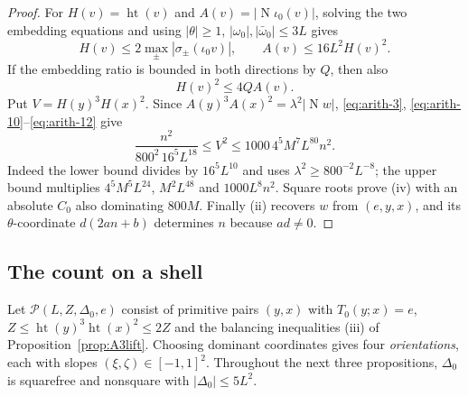 \documentclass[11pt,reqno]{amsart}
\theoremstyle{definition}
\theoremstyle{remark}
\numberwithin{equation}{section}
\newcommand{\Nm}{\operatorname{N}}
\newcommand{\hgt}{\operatorname{ht}}
\begin{document}
\begin{proof}
For $H(v)=\hgt(v)$ and $A(v)=|\Nm\iota_0(v)|$, solving the two
embedding equations and using $|\theta|\ge1$, $|\omega_0|,|\bar\omega_0|\le3L$
gives
\begin{equation}
 H(v)\le2\max_\pm|\sigma_\pm(\iota_0v)|,
 \qquad A(v)\le16L^2H(v)^2.                     \label{eq:arith-11}
\end{equation}
If the embedding ratio is bounded in both directions by $Q$, then also
\begin{equation}
 H(v)^2\le4QA(v).                              \label{eq:arith-12}
\end{equation}
Put $V=H(y)^3H(x)^2$. Since $A(y)^3A(x)^2=\lambda^2|\Nm w|$,
\eqref{eq:arith-3}, \eqref{eq:arith-10}--\eqref{eq:arith-12} give
\begin{equation}
 \frac{n^2}{800^2\,16^5L^{18}}\le V^2
 \le1000\,4^5M^7L^{80}n^2.                      \label{eq:arith-13}
\end{equation}
Indeed the lower bound divides by $16^5L^{10}$ and uses
$\lambda^2\ge800^{-2}L^{-8}$; the upper bound multiplies
$4^5M^5L^{24}$, $M^2L^{48}$ and $1000L^8n^2$.
Square roots prove (iv) with an absolute $C_0$ also dominating $800M$.
Finally (ii) recovers $w$ from $(e,y,x)$, and its $\theta$-coordinate
$d(2an+b)$ determines $n$ because $ad\ne0$.
\end{proof}

\subsection{The count on a shell}
Let $\mathcal P(L,Z,\Delta_0,e)$ consist of primitive pairs $(y,x)$
with $T_0(y;x)=e$, $Z\le\hgt(y)^3\hgt(x)^2\le2Z$ and the balancing
inequalities (iii) of Proposition~\ref{prop:A3lift}. Choosing dominant
coordinates gives four \emph{orientations}, each with slopes
$(\xi,\zeta)\in[-1,1]^2$. Throughout the next three propositions,
$\Delta_0$ is squarefree and nonsquare with $|\Delta_0|\le5L^2$.
\end{document}
